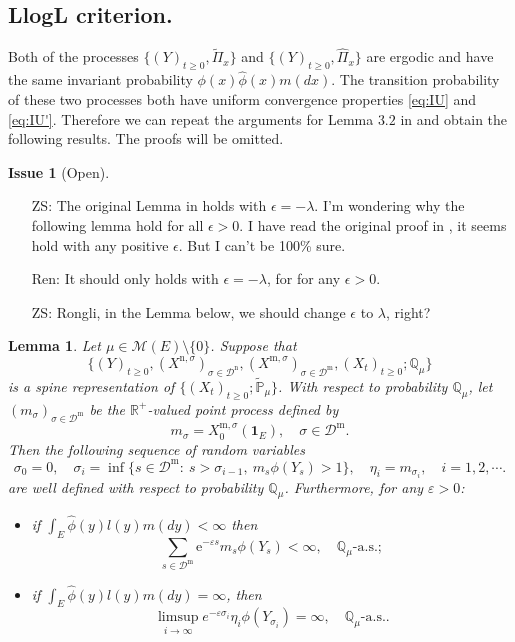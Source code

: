 \documentclass[12pt,a4paper]{amsart}
\numberwithin{equation}{section}
\theoremstyle{plain}
\newtheorem{lem}[thm]{Lemma}
\theoremstyle{definition}
\newtheorem{iss}{Issue}
\begin{document}
\subsection{LlogL criterion.}

Both of the processes $\{(Y)_{t\geq 0}, \widetilde\Pi_x\}$ and $\{(Y)_{t\geq 0}, \widehat{\Pi}_x\}$ are ergodic and have the same invariant probability $\phi(x)\widehat\phi(x)m(dx)$.
The transition probability of these two processes both have uniform convergence properties \eqref{eq:IU} and \eqref{eq:IU'}.
Therefore we can repeat the arguments for Lemma $3.2$ in \cite{LiuRenSong2009Log} and obtain the following results.
The proofs will be omitted.

\begin{iss}[Open]~
  \begin{itemize}
  \item[ZS:]
The original Lemma in \cite{LiuRenSong2009Log} holds with $\epsilon = -\lambda$. I'm wondering why the following lemma hold for all $\epsilon>0$. I have read the original proof in \cite{LiuRenSong2009Log}, it seems hold with any positive $\epsilon$. But I can't be 100\% sure. 

\item[Ren:] 
It should only holds with $\epsilon = -\lambda$, for for any $\epsilon>0.$

\item[ZS:]
 Rongli, in the Lemma below, we should change $\epsilon$ to $\lambda$, right?
  \end{itemize}
\end{iss}
\begin{lem}\label{lem:import_lemma}
	Let $\mu \in \mathcal M(E)\setminus \{0\}$.
	Suppose that \[\{(Y)_{t\geq 0}, (X^{\mathrm n, \sigma})_{\sigma\in \mathcal D^\mathrm n}, (X^{\mathrm m, \sigma})_{\sigma \in \mathcal D^\mathrm m}, (X_t)_{t\geq 0}; \mathbb Q_{\mu}\}\] is a spine representation of $\{(X_t)_{t\geq 0}; \widetilde {\mathbb P}_\mu\}$.
	With respect to probability $\mathbb Q_\mu$, let $(m_\sigma)_{\sigma\in \mathcal D^{\mathrm m}}$ be the $\mathbb R^+$-valued point process defined by
  \[
  	m_\sigma = X^{\mathrm m, \sigma}_0(\mathbf 1_E),
  	\quad \sigma \in \mathcal D^{\mathrm m}.
  \]
	Then the following sequence of random variables
  \[
    \sigma_0=0,\quad \sigma_i=\inf\{s\in\mathcal D^{\mathrm m}:\ s>\sigma_{i-1},\ m_s\phi(Y_s)>1\}, \quad\eta_i=m_{\sigma_i},\quad i=1,2,\cdots.
  \]
	are well defined with respect to probability $\mathbb Q_\mu$.
	Furthermore, for any $\varepsilon>0$:
  \begin{itemize}
  \item
    if $\int_E\widehat{\phi}(y)l(y)m(dy)<\infty$ then
  \[
    \sum_{s\in\mathcal D^{\mathrm m}}\mbox{e}^{-\varepsilon s}m_s\phi(Y_s) < \infty, \quad
    \mathbb Q_{\mu}\text{-a.s.};
  \]
\item
  if $ \int_E\widehat{\phi}(y)l(y)m(dy)=\infty$, then
  \[
    \limsup_{i\rightarrow\infty}e^{-\varepsilon \sigma_i}\eta_i
    \phi(Y_{\sigma_i})=\infty,
    \quad \mathbb Q_{\mu}\text{-a.s.}.
  \]
\end{itemize}
\end{lem}
\end{document}
